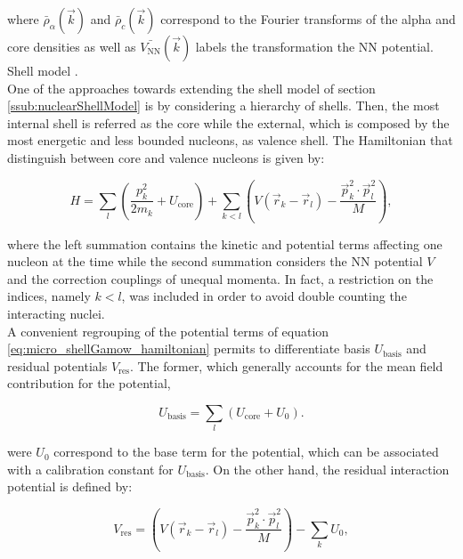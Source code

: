 \documentclass[openany]{book}
\begin{document}
where $\bar {\rho}_\alpha (\vec k)$ and $\bar {\rho}_c(\vec k) $ correspond to the Fourier transforms of the alpha and core densities as well as $\bar{V_{\mathrm{NN}}}(\vec k)$ labels the transformation the $\mathrm{NN}$ potential.  \\

Shell model \cite{dong_wang_michel_ploszajczak_2022}.  \\

One of the approaches towards extending the shell model of section \ref{ssub:nuclearShellModel} is by considering a hierarchy of shells. Then, the most internal shell is referred as the core while the external, which is composed by the most energetic and less bounded nucleons, as valence shell. The Hamiltonian that  distinguish between core and valence nucleons is given by:

\begin{equation}\label{eq:micro_shellGamow_hamiltonian}
	H = \sum_l  \left( \frac{p^2_k}{2m_k} + U_{\mathrm{core}} \right) + \sum_{k < l} \left( {V(\vec r_k - \vec r_l) - \frac{\vec p^2_k \cdot \vec p^2_l}{M}} \right),
\end{equation}

where the left summation contains the kinetic and potential terms affecting one nucleon at the time while the second summation considers the $\mathrm{NN}$ potential $V$ and the correction couplings of unequal momenta. In fact, a restriction on the indices, namely $k < l$, was included in order to avoid double counting the interacting nuclei. \\   

A convenient regrouping of the potential terms of equation \ref{eq:micro_shellGamow_hamiltonian} permits to differentiate basis $U_{\mathrm{basis}}$ and residual potentials $V_{\mathrm{res}}$. The former, which generally accounts for the mean field contribution for the potential, 

\begin{equation}\label{eq:micro_shellGamow_basis}
	U_{\mathrm{basis}} = \sum_l (  U_{\mathrm{core}} + U_0).
\end{equation}

were $U_0$ correspond to the base term for the potential, which can be associated with a calibration constant for $U_{\mathrm{basis}}$. On the other hand, the residual interaction potential is defined by: 

\begin{equation}\label{eq:micro_shellGamow_residual}
	V_{\mathrm{res}} = \left( {V(\vec r_k - \vec r_l) - \frac{\vec p^2_k \cdot \vec p^2_l}{M}} \right) - \sum_k U_0,
\end{equation}
\end{document}
